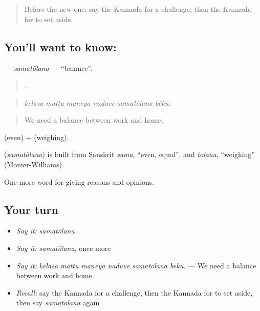 \label{lesson:KA-C387-samatolana}



\begin{quote}
Before the new one: say the Kannada for a challenge, then the Kannada for to set aside.
\end{quote}

\subsection*{You'll want to know: }
\textbf{} — \emph{samatōlana} — \textquotedblleft{}balance\textquotedblright{}.

\begin{quote}
     .
\end{quote}

\begin{quote}
\emph{kelasa mattu maneya naḍuve samatōlana bēku.}
\end{quote}

\begin{quote}
We need a balance between work and home.
\end{quote}

 (even) +  (weighing).

\begin{cousinweb}
\textbf{} (\emph{samatōlana}) is built from Sanskrit \emph{sama}, \textquotedblleft{}even, equal\textquotedblright{}, and \emph{tolana}, \textquotedblleft{}weighing\textquotedblright{} (Monier-Williams).
\end{cousinweb}

\begin{grammarlens}[title={What you've built}]
One more word for giving reasons and opinions.
\end{grammarlens}

\subsection*{Your turn}
\begin{itemize}
\raggedright
  \item \emph{Say it:} \emph{samatōlana}
  \item \emph{Say it:} \emph{samatōlana}, once more
  \item \emph{Say it:} \emph{kelasa mattu maneya naḍuve samatōlana bēku.} — We need a balance between work and home.
  \item \emph{Recall:} say the Kannada for a challenge, then the Kannada for to set aside, then say \emph{samatōlana} again
\end{itemize}

